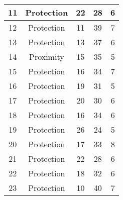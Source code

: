 \documentclass[results.tex]{subfiles}
\begin{document}
\begin{center}
\begin{tabular}{| c || c | c | c | c |}
            \hline
            11                      & Protection                   & 22                     & 28                      & 6                    \\
            \hline
            12                      & Protection                   & 11                     & 39                      & 7                    \\
            \hline
            13                      & Protection                   & 13                     & 37                      & 6                    \\
            \hline
            14                      & Proximity                    & 15                     & 35                      & 5                    \\
            \hline
            15                      & Protection                   & 16                     & 34                      & 7                    \\
            \hline
            16                      & Protection                   & 19                     & 31                      & 5                    \\
            \hline
            17                      & Protection                   & 20                     & 30                      & 6                    \\
            \hline
            18                      & Protection                   & 16                     & 34                      & 6                    \\
            \hline
            19                      & Protection                   & 26                     & 24                      & 5                    \\
            \hline
            20                      & Protection                   & 17                     & 33                      & 8                    \\
            \hline
            21                      & Protection                   & 22                     & 28                      & 6                    \\
            \hline
            22                      & Protection                   & 18                     & 32                      & 6                    \\
            \hline
            23                      & Protection                   & 10                     & 40                      & 7                    \\

\end{tabular}
\end{center}
\end{document}
